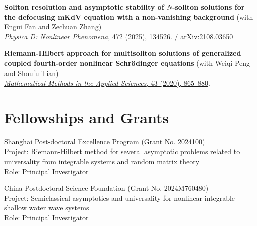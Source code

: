 \documentclass[12pt,a4paper]{article}
\begin{document}
\begin{cv}{}
\begin{etaremune}
    \item \textbf{Soliton resolution and asymptotic stability of $N$-soliton solutions for the defocusing mKdV equation with a non-vanishing background} (with Engui Fan and Zechuan Zhang)\\
    \href{https://doi.org/10.1016/j.physd.2025.134526}{{\sl Physica D: Nonlinear Phenomena}, 472 (2025), 134526}. / \href{https://arxiv.org/abs/2108.03650}{arXiv:2108.03650}

    \item \textbf{Riemann-Hilbert approach for multisoliton solutions of generalized coupled fourth-order nonlinear Schr\"odinger equations}
    (with Weiqi Peng and Shoufu Tian)\\
    \href{https://onlinelibrary.wiley.com/doi/10.1002/mma.5964}{{\sl Mathematical Methods in the Applied Sciences}, 43 (2020), 865--880}.
\end{etaremune}


\section{Fellowships and Grants}
\begin{cvlist}{}
\item[Jul 2024 -- Jun 2026]
Shanghai Post-doctoral Excellence Program (Grant No. 2024100)\\
Project: Riemann-Hilbert method for several asymptotic problems related to universality from integrable systems and random matrix theory  \\
Role: Principal Investigator

\item[Jul 2024 -- Jun 2026]
China Postdoctoral Science Foundation (Grant No. 2024M760480)\\
Project: Semiclassical asymptotics and universality for nonlinear integrable shallow water wave systems \\
Role: Principal Investigator
\end{cvlist}



\end{cv}
\end{document}
